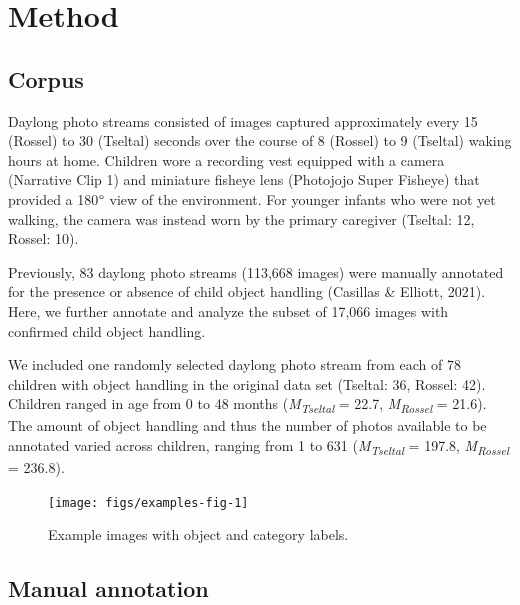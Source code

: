 \documentclass[10pt, letterpaper]{article}
\newenvironment{CodeChunk}{}{}
\begin{document}
\hypertarget{method}{%
\section{Method}\label{method}}

\hypertarget{corpus}{%
\subsection{Corpus}\label{corpus}}

Daylong photo streams consisted of images captured approximately every
15 (Rossel) to 30 (Tseltal) seconds over the course of 8 (Rossel) to 9
(Tseltal) waking hours at home. Children wore a recording vest equipped
with a camera (Narrative Clip 1) and miniature fisheye lens (Photojojo
Super Fisheye) that provided a 180\(\text{\textdegree}\) view of the
environment. For younger infants who were not yet walking, the camera
was instead worn by the primary caregiver (Tseltal: 12, Rossel: 10).

Previously, 83 daylong photo streams (113,668 images) were manually
annotated for the presence or absence of child object handling (Casillas
\& Elliott, 2021). Here, we further annotate and analyze the subset of
17,066 images with confirmed child object handling.

We included one randomly selected daylong photo stream from each of 78
children with object handling in the original data set (Tseltal: 36,
Rossel: 42). Children ranged in age from 0 to 48 months
(\emph{M}\textsubscript{\emph{Tseltal}} = 22.7,
\emph{M}\textsubscript{\emph{Rossel}} = 21.6). The amount of object
handling and thus the number of photos available to be annotated varied
across children, ranging from 1 to 631
(\emph{M}\textsubscript{\emph{Tseltal}} = 197.8,
\emph{M}\textsubscript{\emph{Rossel}} = 236.8).

\begin{CodeChunk}
\begin{figure}[h]

{\centering \texttt{[image: figs/examples-fig-1]} 

}

\caption[Example images with object and category labels]{Example images with object and category labels.}\label{fig:examples-fig}
\end{figure}
\end{CodeChunk}

\hypertarget{manual-annotation}{%
\subsection{Manual annotation}\label{manual-annotation}}
\end{document}
